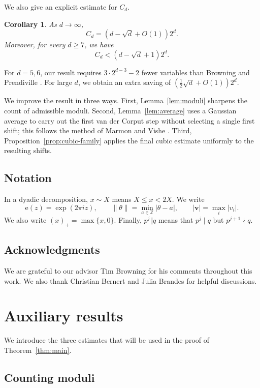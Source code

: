 \documentclass[reqno,a4paper,11pt]{amsart}
\numberwithin{equation}{section}
\newcommand{\ZZ}{\mathbb Z}
\newcommand{\e}{\mathrm e}
\theoremstyle{plain}
\newtheorem{corollary}[theorem]{Corollary}
\theoremstyle{definition}
\begin{document}
\medskip

We also give an explicit estimate for \(C_d\).

\begin{corollary}\label{cor:asymptotic}
As \(d\to\infty\),
\[
 C_d=
 \left(d-\sqrt d+O(1)\right)2^d.
\]
Moreover, for every \(d\geq7\), we have
\[
 C_d<\left(d-\sqrt d+1\right)2^d.
\]
\end{corollary}

For \(d=5,6\), our result requires \(3\cdot2^{d-3}-2\) fewer variables than Browning and Prendiville \cite{bp}.
For large \(d\), we obtain an extra saving of \((\frac12\sqrt d+O(1))2^d\).

\medskip
We improve the result in three ways.
First, Lemma~\ref{lem:moduli} sharpens the count of admissible moduli.
Second, Lemma~\ref{lem:average} uses a Gaussian average to carry out the first van der Corput step without selecting a single first shift; this follows the method of Marmon and Vishe \cite[Section~3.2]{marmon_vishe_quartic}.
Third, Proposition~\ref{prop:cubic-family} applies the final cubic estimate uniformly to the resulting shifts.

\subsection*{Notation}
In a dyadic decomposition, \(x\sim X\) means \(X\leq x<2X\).
We write
\[
 \e(z)=\exp(2\pi iz),\qquad
 \|\theta\|=\min_{a\in\ZZ}|\theta-a|,\qquad
 |\mathbf v|=\max_i|v_i|.
\]
We also write \((x)_+=\max\{x,0\}\).
Finally, \(p^j\Vert q\) means that \(p^j\mid q\) but \(p^{j+1}\nmid q\).
\subsection*{Acknowledgments}

We are grateful to our advisor Tim Browning for his comments throughout this work.
We also thank Christian Bernert and Julia Brandes for helpful discussions.

\section{Auxiliary results}\label{sec:inputs}

We introduce the three estimates that will be used in the proof of Theorem~\ref{thm:main}.

\subsection{Counting moduli}
\end{document}
